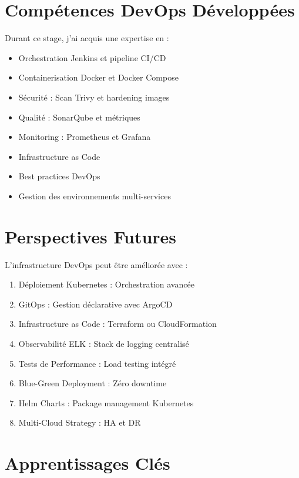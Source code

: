 \documentclass[12pt,a4paper]{report}
\begin{document}
\section*{Compétences DevOps Développées}

Durant ce stage, j'ai acquis une expertise en :

\begin{itemize}
    \item Orchestration Jenkins et pipeline CI/CD
    \item Containerisation Docker et Docker Compose
    \item Sécurité : Scan Trivy et hardening images
    \item Qualité : SonarQube et métriques
    \item Monitoring : Prometheus et Grafana
    \item Infrastructure as Code
    \item Best practices DevOps
    \item Gestion des environnements multi-services
\end{itemize}

\section*{Perspectives Futures}

L'infrastructure DevOps peut être améliorée avec :

\begin{enumerate}
    \item Déploiement Kubernetes : Orchestration avancée
    \item GitOps : Gestion déclarative avec ArgoCD
    \item Infrastructure as Code : Terraform ou CloudFormation
    \item Observabilité ELK : Stack de logging centralisé
    \item Tests de Performance : Load testing intégré
    \item Blue-Green Deployment : Zéro downtime
    \item Helm Charts : Package management Kubernetes
    \item Multi-Cloud Strategy : HA et DR
\end{enumerate}

\section*{Apprentissages Clés}
\end{document}
